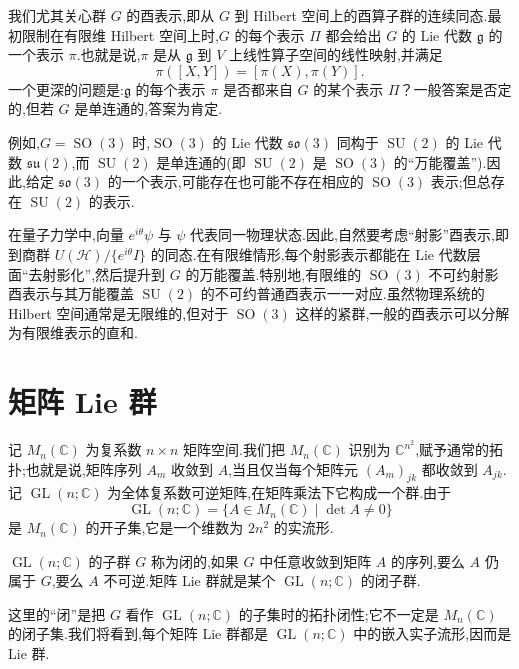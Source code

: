 我们尤其关心群 $G$ 的酉表示,即从 $G$ 到 Hilbert 空间上的酉算子群的连续同态.最初限制在有限维 Hilbert 空间上时,$G$ 的每个表示 $\Pi$ 都会给出 $G$ 的 Lie 代数 $\mathfrak g$ 的一个表示 $\pi$.也就是说,$\pi$ 是从 $\mathfrak g$ 到 $V$ 上线性算子空间的线性映射,并满足
\[
\pi([X,Y])=[\pi(X),\pi(Y)].
\]
一个更深的问题是:$\mathfrak g$ 的每个表示 $\pi$ 是否都来自 $G$ 的某个表示 $\Pi$？一般答案是否定的,但若 $G$ 是单连通的,答案为肯定.

例如,$G=\operatorname{SO}(3)$ 时,$\operatorname{SO}(3)$ 的 Lie 代数 $\mathfrak{so}(3)$ 同构于 $\operatorname{SU}(2)$ 的 Lie 代数 $\mathfrak{su}(2)$,而 $\operatorname{SU}(2)$ 是单连通的(即 $\operatorname{SU}(2)$ 是 $\operatorname{SO}(3)$ 的“万能覆盖”).因此,给定 $\mathfrak{so}(3)$ 的一个表示,可能存在也可能不存在相应的 $\operatorname{SO}(3)$ 表示;但总存在 $\operatorname{SU}(2)$ 的表示.

在量子力学中,向量 $e^{i\theta}\psi$ 与 $\psi$ 代表同一物理状态.因此,自然要考虑“射影”酉表示,即到商群 $U(\mathcal H)/\{e^{i\theta}I\}$ 的同态.在有限维情形,每个射影表示都能在 Lie 代数层面“去射影化”,然后提升到 $G$ 的万能覆盖.特别地,有限维的 $\operatorname{SO}(3)$ 不可约射影酉表示与其万能覆盖 $\operatorname{SU}(2)$ 的不可约普通酉表示一一对应.虽然物理系统的 Hilbert 空间通常是无限维的,但对于 $\operatorname{SO}(3)$ 这样的紧群,一般的酉表示可以分解为有限维表示的直和.

\section{矩阵 Lie 群}
\label{sec:matrix-lie-groups}

记 $M_n(\mathbb C)$ 为复系数 $n\times n$ 矩阵空间.我们把 $M_n(\mathbb C)$ 识别为 $\mathbb C^{n^2}$,赋予通常的拓扑;也就是说,矩阵序列 $A_m$ 收敛到 $A$,当且仅当每个矩阵元 $(A_m)_{jk}$ 都收敛到 $A_{jk}$.记 $\operatorname{GL}(n;\mathbb C)$ 为全体复系数可逆矩阵,在矩阵乘法下它构成一个群.由于
\[
\operatorname{GL}(n;\mathbb C)=\{A\in M_n(\mathbb C)\mid\det A\neq0\}
\]
是 $M_n(\mathbb C)$ 的开子集,它是一个维数为 $2n^2$ 的实流形.

\begin{definition}[矩阵 Lie 群]\label{def:matrix-lie-group}
$\operatorname{GL}(n;\mathbb C)$ 的子群 $G$ 称为闭的,如果 $G$ 中任意收敛到矩阵 $A$ 的序列,要么 $A$ 仍属于 $G$,要么 $A$ 不可逆.矩阵 Lie 群就是某个 $\operatorname{GL}(n;\mathbb C)$ 的闭子群.
\end{definition}

这里的“闭”是把 $G$ 看作 $\operatorname{GL}(n;\mathbb C)$ 的子集时的拓扑闭性;它不一定是 $M_n(\mathbb C)$ 的闭子集.我们将看到,每个矩阵 Lie 群都是 $\operatorname{GL}(n;\mathbb C)$ 中的嵌入实子流形,因而是 Lie 群.

